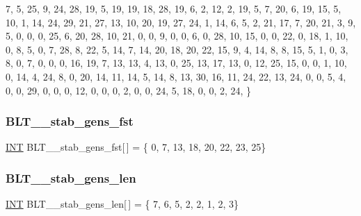 \begin{DoxyCode}
 7,  5, 25,  9, 24, 28, 19,  5, 19, 19, 18, 28, 19,  6,  2, 12,  2, 19,  5,  7, 20,  6, 19, 15,  5, 
10,  1, 14, 24, 29, 21, 27, 13, 10, 20, 19, 27, 24,  1, 14,  6,  5,  2, 21, 17,  7, 20, 21,  3,  9, 
 5,  0,  0,  0, 25,  6, 20, 28, 10, 21,  0,  0,  9,  0,  0,  6,  0, 28, 10, 15,  0,  0, 22,  0, 18, 
 1, 10,  0,  8,  5,  0,  7, 28,  8, 22,  5, 14,  7, 14, 20, 18, 20, 22, 15,  9,  4, 14,  8,  8, 15, 
 5,  1,  0,  3,  8,  0,  7,  0,  0,  0, 16, 19,  7, 13, 13,  4, 13,  0, 25, 13, 17, 13,  0, 12, 25, 
15,  0,  0,  1, 10,  0, 14,  4, 24,  8,  0, 20, 14, 11, 14,  5, 14,  8, 13, 30, 16, 11, 24, 22, 13, 
24,  0,  0,  5,  4,  0,  0, 29,  0,  0,  0, 12,  0,  0,  0,  2,  0,  0, 24,  5, 18,  0,  0,  2, 24, 
\}
\end{DoxyCode}
\mbox{\label{data___b_l_t_8_c_a14378ae1a523bf9ef604fe75985d0ba2}} 
\subsubsection{\texorpdfstring{B\+L\+T\+\_\+\_\+stab\+\_\+gens\+\_\+fst}{BLT\_31\_stab\_gens\_fst}}
{\footnotesize\ttfamily \mbox{\hyperlink{galois_8h_a09fddde158a3a20bd2dcadb609de11dc}{I\+NT}} B\+L\+T\+\_\+\_\+stab\+\_\+gens\+\_\+fst\mbox{[}$\,$\mbox{]} = \{ 0, 7, 13, 18, 20, 22, 23, 25\}}

\mbox{\label{data___b_l_t_8_c_a939b59c30bd05f4532e1e958e846117b}} 
\subsubsection{\texorpdfstring{B\+L\+T\+\_\+\_\+stab\+\_\+gens\+\_\+len}{BLT\_31\_stab\_gens\_len}}
{\footnotesize\ttfamily \mbox{\hyperlink{galois_8h_a09fddde158a3a20bd2dcadb609de11dc}{I\+NT}} B\+L\+T\+\_\+\_\+stab\+\_\+gens\+\_\+len\mbox{[}$\,$\mbox{]} = \{ 7, 6, 5, 2, 2, 1, 2, 3\}}

